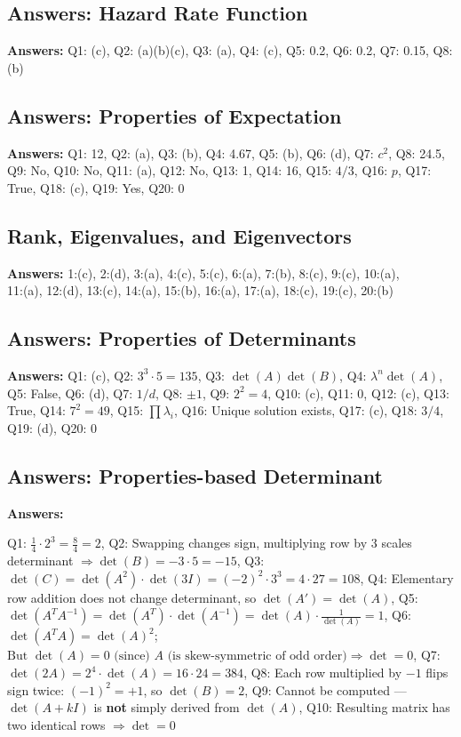 \subsection*{Answers: Hazard Rate Function}
\noindent\textbf{Answers:} Q1: (c), Q2: (a)(b)(c), Q3: (a), Q4: (c), Q5: 0.2, Q6: 0.2, Q7: 0.15, Q8: (b)

\subsection*{Answers: Properties of Expectation}
\noindent\textbf{Answers:} Q1: 12, Q2: (a), Q3: (b), Q4: 4.67, Q5: (b), Q6: (d), Q7: $c^2$, Q8: 24.5, Q9: No, Q10: No, Q11: (a), Q12: No, Q13: 1, Q14: 16, Q15: $4/3$, Q16: $p$, Q17: True, Q18: (c), Q19: Yes, Q20: 0



\subsection*{Rank, Eigenvalues, and Eigenvectors}
\noindent \textbf{Answers: } 1:(c), 2:(d), 3:(a), 4:(c), 5:(c), 6:(a), 7:(b), 8:(c), 9:(c), 10:(a),\\
11:(a), 12:(d), 13:(c), 14:(a), 15:(b), 16:(a), 17:(a), 18:(c), 19:(c), 20:(b)

\subsection*{Answers: Properties of Determinants}
\noindent\textbf{Answers:} Q1: (c), Q2: $3^3 \cdot 5 = 135$, Q3: $\det(A)\det(B)$, Q4: $\lambda^n \det(A)$, Q5: False, Q6: (d), Q7: $1/d$, Q8: $\pm 1$, Q9: $2^2 = 4$, Q10: (c),  
Q11: 0, Q12: (c), Q13: True, Q14: $7^2 = 49$, Q15: $\prod \lambda_i$, Q16: Unique solution exists, Q17: (c), Q18: $3/4$, Q19: (d), Q20: 0

\subsection*{Answers: Properties-based Determinant}
\noindent\textbf{Answers:}

Q1: $\displaystyle \frac{1}{4} \cdot 2^3 = \frac{8}{4} = 2$,  
Q2: Swapping changes sign, multiplying row by 3 scales determinant $\Rightarrow \det(B) = -3 \cdot 5 = -15$,  
Q3: $\det(C) = \det(A^2) \cdot \det(3I) = (-2)^2 \cdot 3^3 = 4 \cdot 27 = 108$,  
Q4: Elementary row addition does not change determinant, so $\det(A') = \det(A)$,  
Q5: $\det(A^T A^{-1}) = \det(A^T) \cdot \det(A^{-1}) = \det(A) \cdot \frac{1}{\det(A)} = 1$,  
Q6: $\det(A^T A) = \det(A)^2$; $\text{But } \det(A) = 0 \text{ (since) } A \text{ (is skew-symmetric of odd order)} \Rightarrow \det = 0$,  
Q7: $\det(2A) = 2^4 \cdot \det(A) = 16 \cdot 24 = 384$,  
Q8: Each row multiplied by $-1$ flips sign  twice: $(-1)^2 = +1$, so $\det(B) = 2$,  
Q9: Cannot be computed — $\det(A + kI)$ is \textbf{not} simply derived from $\det(A)$,  
Q10: Resulting matrix has two identical rows $\Rightarrow \det = 0$

